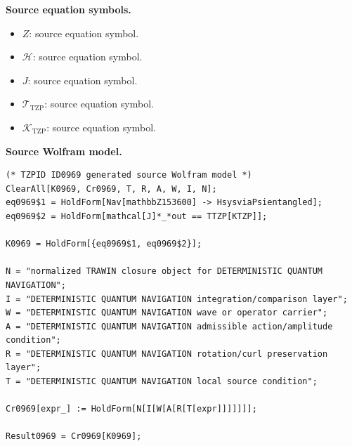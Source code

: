 \begin{minipage}[t]{0.49\linewidth}
\begingroup
\small
\raggedright
\textbf{Source equation symbols.}\par
\begin{itemize}[leftmargin=1.35em,itemsep=1pt,topsep=1pt,parsep=0pt]
    \item $Z$: source equation symbol.
    \item $\mathcal{H}$: source equation symbol.
    \item $J$: source equation symbol.
    \item $\mathcal{T}_{\mathrm{TZP}}$: source equation symbol.
    \item $\mathcal{K}_{\mathrm{TZP}}$: source equation symbol.
\end{itemize}
\endgroup
\end{minipage}\hfill
\begin{minipage}[t]{0.47\linewidth}
\begingroup
\scriptsize
\raggedright
\textbf{Source Wolfram model.}\par
\begin{Verbatim}[fontsize=\tiny,breaklines=true,breakanywhere=true]
(* TZPID ID0969 generated source Wolfram model *)
ClearAll[K0969, Cr0969, T, R, A, W, I, N];
eq0969$1 = HoldForm[Nav[mathbbZ153600] -> HsysviaPsientangled];
eq0969$2 = HoldForm[mathcal[J]*_*out == TTZP[KTZP]];

K0969 = HoldForm[{eq0969$1, eq0969$2}];

N = "normalized TRAWIN closure object for DETERMINISTIC QUANTUM NAVIGATION";
I = "DETERMINISTIC QUANTUM NAVIGATION integration/comparison layer";
W = "DETERMINISTIC QUANTUM NAVIGATION wave or operator carrier";
A = "DETERMINISTIC QUANTUM NAVIGATION admissible action/amplitude condition";
R = "DETERMINISTIC QUANTUM NAVIGATION rotation/curl preservation layer";
T = "DETERMINISTIC QUANTUM NAVIGATION local source condition";

Cr0969[expr_] := HoldForm[N[I[W[A[R[T[expr]]]]]]];

Result0969 = Cr0969[K0969];
\end{Verbatim}
\endgroup
\end{minipage}

